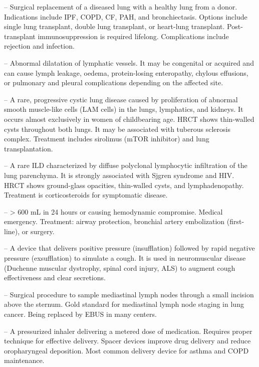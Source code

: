 -- Surgical replacement of a diseased lung with a healthy lung from a donor. Indications include IPF, COPD, CF, PAH, and bronchiectasis. Options include single lung transplant, double lung transplant, or heart-lung transplant. Post-transplant immunosuppression is required lifelong. Complications include rejection and infection.

-- Abnormal dilatation of lymphatic vessels. It may be congenital or acquired and can cause lymph leakage, oedema, protein-losing enteropathy, chylous effusions, or pulmonary and pleural complications depending on the affected site.

-- A rare, progressive cystic lung disease caused by proliferation of abnormal smooth muscle-like cells (LAM cells) in the lungs, lymphatics, and kidneys. It occurs almost exclusively in women of childbearing age. HRCT shows thin-walled cysts throughout both lungs. It may be associated with tuberous sclerosis complex. Treatment includes sirolimus (mTOR inhibitor) and lung transplantation.

-- A rare ILD characterized by diffuse polyclonal lymphocytic infiltration of the lung parenchyma. It is strongly associated with Sjgren syndrome and HIV. HRCT shows ground-glass opacities, thin-walled cysts, and lymphadenopathy. Treatment is corticosteroids for symptomatic disease.

-- > 600 mL in 24 hours or causing hemodynamic compromise. Medical emergency. Treatment: airway protection, bronchial artery embolization (first-line), or surgery.

-- A device that delivers positive pressure (insufflation) followed by rapid negative pressure (exsufflation) to simulate a cough. It is used in neuromuscular disease (Duchenne muscular dystrophy, spinal cord injury, ALS) to augment cough effectiveness and clear secretions.

-- Surgical procedure to sample mediastinal lymph nodes through a small incision above the sternum. Gold standard for mediastinal lymph node staging in lung cancer. Being replaced by EBUS in many centers.

-- A pressurized inhaler delivering a metered dose of medication. Requires proper technique for effective delivery. Spacer devices improve drug delivery and reduce oropharyngeal deposition. Most common delivery device for asthma and COPD maintenance.

